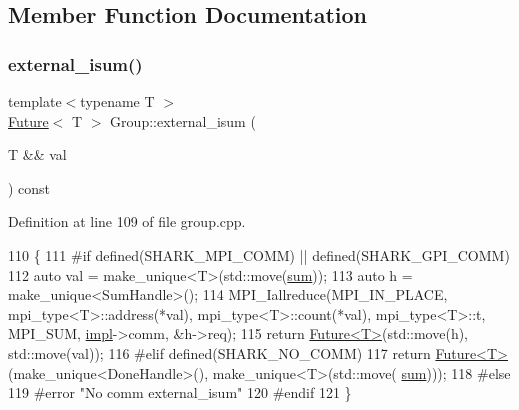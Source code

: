 \subsection{Member Function Documentation}
\hypertarget{classshark_1_1_group_a45c07b72e75f90b39e550e80d7ea2418}{}\label{classshark_1_1_group_a45c07b72e75f90b39e550e80d7ea2418} 
\subsubsection{\texorpdfstring{external\+\_\+isum()}{external\_isum()}}
{\footnotesize\ttfamily template$<$typename T $>$ \\
\hyperlink{structshark_1_1_future}{Future}$<$ T $>$ Group\+::external\+\_\+isum (\begin{DoxyParamCaption}\item[{T \&\&}]{val }\end{DoxyParamCaption}) const}



Definition at line 109 of file group.\+cpp.


\begin{DoxyCode}
110 \{
111 \textcolor{preprocessor}{#if defined(SHARK\_MPI\_COMM) || defined(SHARK\_GPI\_COMM)}
112     \textcolor{keyword}{auto} val = make\_unique<T>(std::move(\hyperlink{namespaceshark_1_1ndim_a864213068a08615fa12bdd67d83ed324}{sum}));
113     \textcolor{keyword}{auto} h = make\_unique<SumHandle>();
114     MPI\_Iallreduce(MPI\_IN\_PLACE, mpi\_type<T>::address(*val), mpi\_type<T>::count(*val), mpi\_type<T>::t, 
      MPI\_SUM, \hyperlink{classshark_1_1_group_a1b1f4345bb3d08df22d32c13bd693580}{impl}->comm, &h->req);
115     \textcolor{keywordflow}{return} \hyperlink{structshark_1_1_future}{Future<T>}(std::move(h), std::move(val));
116 \textcolor{preprocessor}{#elif defined(SHARK\_NO\_COMM)}
117     \textcolor{keywordflow}{return} \hyperlink{structshark_1_1_future}{Future<T>}(make\_unique<DoneHandle>(), make\_unique<T>(std::move(
      \hyperlink{namespaceshark_1_1ndim_a864213068a08615fa12bdd67d83ed324}{sum})));
118 \textcolor{preprocessor}{#else}
119 \textcolor{preprocessor}{#error "No comm external\_isum"}
120 \textcolor{preprocessor}{#endif}
121 \}
\end{DoxyCode}
\hypertarget{classshark_1_1_group_ac254938f11bae1e1cda77072468f9bc1}{}\label{classshark_1_1_group_ac254938f11bae1e1cda77072468f9bc1} 
